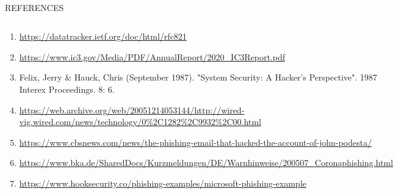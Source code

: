 \documentclass[compress,dvipsnames]{beamer}
\begin{document}
\phantom{X}\\
REFERENCES
\begin{columns}[T]
    \begin{flushleft}
        \begin{column}{0.875\textwidth}
            \begin{minipage}[t]{0.85\textwidth}
                \begin{enumerate}
                    \item \url{https://datatracker.ietf.org/doc/html/rfc821}
                    \item \url{https://www.ic3.gov/Media/PDF/AnnualReport/2020_IC3Report.pdf}
                    \item Felix, Jerry \& Hauck, Chris (September 1987). "System Security: A Hacker's Perspective". 1987 Interex Proceedings. 8: 6.
                    \item \url{https://web.archive.org/web/20051214053144/http://wired-vig.wired.com/news/technology/0\%2C1282\%2C9932\%2C00.html}
                    \item \url{https://www.cbsnews.com/news/the-phishing-email-that-hacked-the-account-of-john-podesta/}
                    \item \url{https://www.bka.de/SharedDocs/Kurzmeldungen/DE/Warnhinweise/200507_Coronaphishing.html}
                    \item \url{https://www.hooksecurity.co/phishing-examples/microsoft-phishing-example}
                \end{enumerate}
            \end{minipage}
        \end{column}
        \hspace{0.75cm}
        \vline
        \hspace{0.75cm}
        \begin{column}{0.125\textwidth}
            \begin{minipage}[t]{0.85\textwidth}
                \vspace{-0.75cm}

\end{minipage}
\end{column}
\end{flushleft}
\end{columns}
\end{document}

